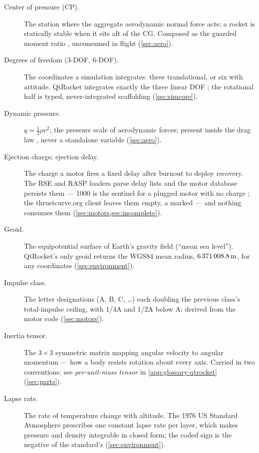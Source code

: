 \begin{description}
\item[Center of pressure (CP).] The station where the aggregate aerodynamic normal force
  acts; a rocket is statically stable when it sits aft of the CG. Composed as the guarded
  moment ratio  , unconsumed in flight
  (\cref{sec:aero}).

\item[Degrees of freedom (3-DOF, 6-DOF).] The coordinates a simulation integrates: three
  translational, or six with attitude. QtRocket integrates exactly the three linear DOF
  ; the rotational half is typed, never-integrated scaffolding
  (\cref{sec:simcore}).

\item[Dynamic pressure.] $q = \tfrac12 \rho v^2$, the pressure scale of aerodynamic forces;
  present inside the drag law , never a standalone variable
  (\cref{sec:aero}).

\item[Ejection charge; ejection delay.] The charge a motor fires a fixed delay after
  burnout to deploy recovery. The RSE and RASP loaders parse delay lists and the motor
  database persists them --- 1000 is the sentinel for a plugged motor with no charge
  ; the thrustcurve.org client leaves them empty, a marked
   --- and nothing consumes them (\cref{sec:motors,sec:incomplete}).

\item[Geoid.] The equipotential surface of Earth's gravity field (``mean sea level'').
  QtRocket's only geoid returns the WGS84 mean radius, $6\,371\,008.8\,\mathrm{m}$, for any
  coordinates  (\cref{sec:environment}).

\item[Impulse class.] The letter designations (A, B, C, \ldots) each doubling the previous
  class's total-impulse ceiling, with 1/4A and 1/2A below A; derived from the motor code
   (\cref{sec:motors}).

\item[Inertia tensor.] The $3\times3$ symmetric matrix mapping angular velocity to angular
  momentum --- how a body resists rotation about every axis. Carried in two conventions;
  see \emph{per-unit-mass tensor} in \cref{app:glossary-qtrocket} (\cref{sec:parts}).

\item[Lapse rate.] The rate of temperature change with altitude. The 1976 US Standard
  Atmosphere prescribes one constant lapse rate per layer, which makes pressure and density
  integrable in closed form; the coded sign is the negative of the standard's
   (\cref{sec:environment}).


\end{description}

